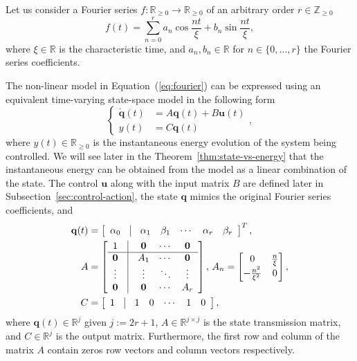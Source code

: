 \documentclass[letterpaper,10pt,conference]{ieeeconf}
\begin{document}
Let us consider a Fourier series $f:\mathbb{R}_{\geq 0}\rightarrow\mathbb{R}_{\geq 0}$ of an arbitrary order $r\in\mathbb{Z}_{\geq 0}$
\begin{equation}\label{eq:fourier}
  f(t)=\sum_{n=0}^{r}{a_n\cos{\frac{nt}{\xi}}+b_n\sin{\frac{nt}{\xi}}},
\end{equation}
where $\xi\in\mathbb{R}$ is the characteristic time, and $a_n, b_n\in\mathbb{R}$ for $n\in\{0,\dotsc,r\}$ the Fourier series coefficients.

The non-linear model in Equation~(\ref{eq:fourier}) can be expressed using an equivalent time-varying state-space model in the following form
\begin{equation}\label{eq:state-perf}\begin{cases}
  \dot{\mathbf{q}}(t)&=A\mathbf{q}(t)+B\mathbf{u}(t)\\%
  y(t)&=C\mathbf{q}(t)%
\end{cases},\end{equation}
where $y(t)\in\mathbb{R}_{\geq 0}$ is the instantaneous energy evolution of the system being controlled. We will see later in the Theorem~\ref{thm:state-vs-energy} that the instantaneous energy can be obtained from the model as a linear combination of the state. The control $\mathbf{u}$ along with the input matrix $B$ are defined later in Subsection~\ref{sec:control-action}, the state $\mathbf{q}$ mimics the original Fourier series coefficients, and
\begin{equation}\label{eq:state-details}\begin{split}
  \mathbf{q}(t)&=\left[\begin{array}{ccccccc}
    \alpha_0 & \vline & \alpha_1 & \beta_1 & \cdots & \alpha_r & \beta_r
  \end{array}\right]^T,\\
  A&=\left[\begin{array}{ccccc}
    1          & \vline & \mathbf{0} & \cdots & \mathbf{0} \\\hline
    \mathbf{0} & \vline & A_1        & \cdots & \mathbf{0} \\
    \vdots     & \vline & \vdots     & \ddots & \vdots     \\
    \mathbf{0} & \vline & \mathbf{0} & \cdots & A_r 
  \end{array}\right],\,A_n=\begin{bmatrix}0 & \frac{n}{\xi} \\ -\frac{n^2}{\xi^2} & 0\end{bmatrix},\\
  C&=\left[\begin{array}{ccccccc}
    1 & \vline & 1 & 0 & \cdots & 1 & 0
  \end{array}\right],
\end{split}\end{equation}
where $\mathbf{q}(t)\in\mathbb{R}^j$ given $j:=2r+1$, $A\in\mathbb{R}^{j\times j}$ is the state transmission matrix, and $C\in\mathbb{R}^j$ is the output matrix. Furthermore, the first row and column of the matrix $A$ contain zeros row vectors and column vectors respectively.
\end{document}
